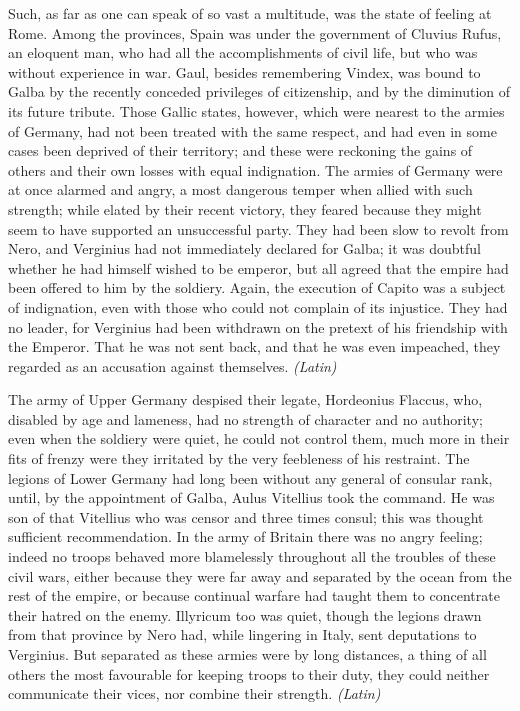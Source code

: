 
Such, as far as one can speak of so vast a multitude, was the state of feeling at Rome. Among the provinces, Spain was under the government of Cluvius Rufus, an eloquent man, who had all the accomplishments of civil life, but who was without experience in war. Gaul, besides remembering Vindex, was bound to Galba by the recently conceded privileges of citizenship, and by the diminution of its future tribute. Those Gallic states, however, which were nearest to the armies of Germany, had not been treated with the same respect, and had even in some cases been deprived of their territory; and these were reckoning the gains of others and their own losses with equal indignation. The armies of Germany were at once alarmed and angry, a most dangerous temper when allied with such strength; while elated by their recent victory, they feared because they might seem to have supported an unsuccessful party. They had been slow to revolt from Nero, and Verginius had not immediately declared for Galba; it was doubtful whether he had himself wished to be emperor, but all agreed that the empire had been offered to him by the soldiery. Again, the execution of Capito was a subject of indignation, even with those who could not complain of its injustice. They had no leader, for Verginius had been withdrawn on the pretext of his friendship with the Emperor. That he was not sent back, and that he was even impeached, they regarded as an accusation against themselves. \emph{(Latin)}


The army of Upper Germany despised their legate, Hordeonius Flaccus, who, disabled by age and lameness, had no strength of character and no authority; even when the soldiery were quiet, he could not control them, much more in their fits of frenzy were they irritated by the very feebleness of his restraint. The legions of Lower Germany had long been without any general of consular rank, until, by the appointment of Galba, Aulus Vitellius took the command. He was son of that Vitellius who was censor and three times consul; this was thought sufficient recommendation. In the army of Britain there was no angry feeling; indeed no troops behaved more blamelessly throughout all the troubles of these civil wars, either because they were far away and separated by the ocean from the rest of the empire, or because continual warfare had taught them to concentrate their hatred on the enemy. Illyricum too was quiet, though the legions drawn from that province by Nero had, while lingering in Italy, sent deputations to Verginius. But separated as these armies were by long distances, a thing of all others the most favourable for keeping troops to their duty, they could neither communicate their vices, nor combine their strength. \emph{(Latin)}

